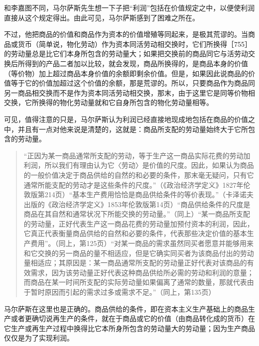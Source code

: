 和李嘉图不同，马尔萨斯先生想一下子把“利润”包括在价值规定之中，以便使利润直接从这个规定得出。由此可见，马尔萨斯感到了困难之所在。

不过，他把商品的价值和商品作为资本的价值增殖等同起来，是极其荒谬的。当商品或货币（简单说，物化劳动）作为资本同活劳动相交换时，它们所换得［755］的劳动量总是比它们本身所包含的劳动量大；如果把交换前的商品同它与活劳动交换后所得到的产品二者加以比较，就会发现，商品所换得的，是商品本身的价值（等价物）加上超过商品本身价值的余额即剩余价值。但是，如果因此说商品的价值等于它的价值加超过这个价值的余额，那是荒谬的。所以，只要商品作为商品同另一商品相交换而不是作为资本同活劳动相交换，那末，由于这里它是同等价物相交换，它所换得的物化劳动量就和它自身所包含的物化劳动量相等。

可见，值得注意的只是，马尔萨斯认为利润已经直接地现成地包括在商品的价值之中，并且有一点对他来说是清楚的，这就是：商品所支配的劳动量始终大于它所包含的劳动量。

\begin{quote}{“正因为某一商品通常所支配的劳动，等于生产这一商品实际花费的劳动加利润，所以我们有理由认为它〈劳动〉是价值的尺度。因此，如果认为商品的一般价值决定于商品供给的自然的和必要的条件，那末毫无疑问，只有它通常所能支配的劳动才是这些条件的尺度。”（《政治经济学定义》1827年伦敦版第214页）“基本生产费用恰恰是商品供给条件的等价表现。”（卡泽诺夫出版的《政治经济学定义》1853年伦敦版第14页）“商品供给条件的尺度是商品在其自然和通常状况下所能交换的劳动量。”（同上）“某一商品所支配的劳动量，正好代表生产这一商品花费的劳动量加预付资本的利润，因此，它真正代表衡量商品供给的自然和必要的条件，代表那些决定价值的基本生产费用”。（同上，第125页）“对某一商品的需求虽然同买者愿意并能够用来和它交换的另一商品的量不相适应，但是它确实同买者为该商品付出的劳动量相适应；其原因是：某一商品通常所支配的劳动量正好代表对该商品的有效需求，因为该劳动量正好代表这种商品供给所必需的劳动和利润的意量；而商品在某一时间所支配的实际劳动量如果偏离了通常的数量，那就代表由于暂时原因而引起的需求过多或需求不足。”（同上，第135页）}\end{quote}

马尔萨斯在这里也是正确的。商品供给的条件，即在资本主义生产基础上的商品生产或者更确切说再生产的条件，就在于商品或它的价值（由商品转化成的货币）在它生产或再生产过程中换得比它本所身所包含的劳动量大的劳动量；因为生产商品仅仅是为了实现利润。

